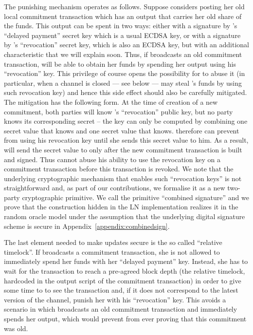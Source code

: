     The punishing mechanism operates as follows. Suppose \alice{} considers
    posting her old local commitment transaction which  has an output that
    carries her old share of the funds. This output can be spent in two ways:
    either with a signature by \alice's ``delayed payment'' secret key which is
    a usual ECDSA key, or with a signature by \bob's ``revocation'' secret key,
    which is also an ECDSA key, but with an additional characteristic that we
    will explain soon. Thus, if \alice{} broadcasts an old commitment
    transaction, \bob{} will be able to obtain her funds by spending her output
    using his ``revocation'' key. This privilege of course opens the possibility
    for \bob{} to abuse it (in particular, when a channel is closed --- see
    below --- \bob{} may steal \alice's funds by using such revocation key) and
    hence this side effect should also be carefully mitigated. The mitigation
    has the following form. At the time of creation of a new commitment, both
    parties will know \bob's ``revocation'' public key, but no party knows its
    corresponding secret -- the key can only be computed by combining one secret
    value that \alice{} knows and one secret value that \bob{} knows. \alice{}
    therefore can prevent \bob{} from using his revocation key until she  sends
    this secret value to him. As a result, \alice{} will send the secret value
    to \bob{} only after the new commitment transaction is built and signed.
    Thus \bob{} cannot abuse his ability to use the revocation key on a
    commitment transaction before this transaction is revoked. We note that the
    underlying cryptographic mechanism  that enables such ``revocation keys''
    is not straightforward and, as part of our contributions, we formalise it as
    a new two-party cryptographic primitive. We call the primitive ``combined
    signature'' and we prove that the construction hidden in the LN
    implementation realizes it in the random oracle model under the assumption
    that the underlying digital signature scheme is secure in
    Appendix~\ref{appendix:combinedsign}.

    The last element needed to make updates secure is the so called ``relative
    timelock''. If \alice{} broadcasts a commitment transaction, she is not
    allowed to immediately spend her funds with her ``delayed payment'' key.
    Instead, she has to wait for the transaction to reach a pre-agreed block
    depth (the relative timelock, hardcoded in the output script of the
    commitment transaction) in order to give some time to \bob{} to see the
    transaction and, if it does not correspond to the latest version of the
    channel, punish her with his ``revocation'' key. This avoids a scenario in
    which \alice{} broadcasts an old commitment transaction and immediately
    spends her output, which would prevent \bob{} from ever proving that this
    commitment was old.

